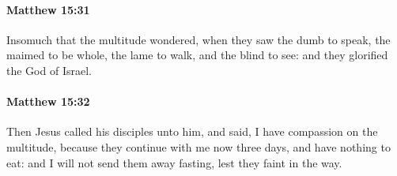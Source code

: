 		\paragraph{Matthew 15:31} %
			\label{MATTHEW-15-31}

			Insomuch that the multitude wondered, when they saw the dumb to speak, the maimed to be whole, the lame to walk, and the blind to see: and they glorified the God of Israel.

			\begin{framed}
			\scriptsize
				\begin{compactdesc}
					\item[SBLG] 
				\end{compactdesc}
			\end{framed}

		\paragraph{Matthew 15:32} %
			\label{MATTHEW-15-32}

			Then Jesus called his disciples unto him, and said, I have compassion on the multitude, because they continue with me now three days, and have nothing to eat: and I will not send them away fasting, lest they faint in the way.


